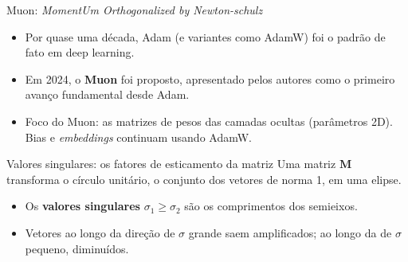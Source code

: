 \documentclass[aspectratio=169,xcolor=dvipsnames]{beamer}
\begin{document}
  \begin{frame}{Muon: \textit{MomentUm Orthogonalized by Newton-schulz}}
    \begin{itemize}
      \item Por quase uma década, Adam (e variantes como AdamW) foi o padrão de fato em
        deep learning.
      \item Em 2024, o \textbf{Muon} foi proposto, apresentado pelos autores como o
        primeiro avanço fundamental desde Adam.
      \item Foco do Muon: as \alert{matrizes de pesos} das camadas ocultas (parâmetros 2D).
        Bias e \textit{embeddings} continuam usando AdamW.
    \end{itemize}
  \end{frame}

  \begin{frame}{Valores singulares: os fatores de esticamento da matriz}
    Uma matriz $\mathbf{M}$ transforma o círculo unitário, o conjunto dos vetores de norma 1, em uma \alert{elipse}.
    \vfill
    \centering
    \vfill
    \raggedright
    \begin{itemize}
      \item Os \textbf{valores singulares} $\sigma_1\ge\sigma_2$ são os comprimentos dos semieixos.
      \item Vetores ao longo da direção de $\sigma$ grande saem amplificados; ao longo da de $\sigma$ pequeno, diminuídos.
    \end{itemize}
  \end{frame}
\end{document}
